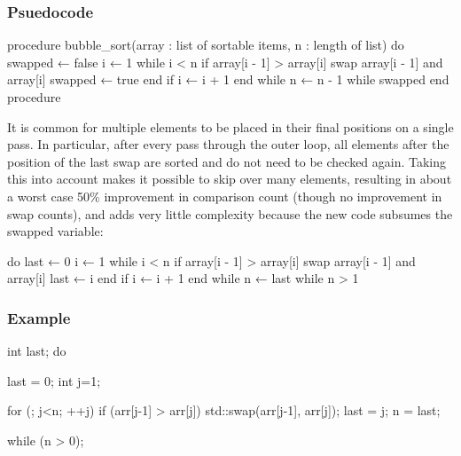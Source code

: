 \documentclass{report}
\begin{document}
    \subsubsection{Psuedocode}
    \bigbreak \noindent 
    \begin{cppcode}
procedure bubble_sort(array : list of sortable items, n : length of list)
    do
        swapped ← false
        i ← 1
        while i < n
            if array[i - 1] > array[i]
                swap array[i - 1] and array[i]
                swapped ← true
            end if
            i ← i + 1
        end while
        n ← n - 1
    while swapped
end procedure
    \end{cppcode}
    \bigbreak \noindent 
    It is common for multiple elements to be placed in their final positions on a single pass. In particular, after every pass through the outer loop, all elements after the position of the last swap are sorted and do not need to be checked again. Taking this into account makes it possible to skip over many elements, resulting in about a worst case 50\% improvement in comparison count (though no improvement in swap counts), and adds very little complexity because the new code subsumes the swapped variable:
    \bigbreak \noindent 
    \begin{cppcode}
     do
        last ← 0
        i ← 1
        while i < n
            if array[i - 1] > array[i]
                swap array[i - 1] and array[i]
                last ← i
            end if
            i ← i + 1
        end while
        n ← last
    while n > 1
    \end{cppcode}

    \pagebreak 
    \subsubsection{Example}
    \bigbreak \noindent 
    \begin{cppcode}
        int last;
        do  {
            last = 0;
            int j=1;

            for (; j<n; ++j) {
                if (arr[j-1] > arr[j]) {
                    std::swap(arr[j-1], arr[j]);
                    last = j;
                }
            }
            n = last;

        } while (n > 0);
    \end{cppcode}

    \bigbreak \noindent 
\end{document}
